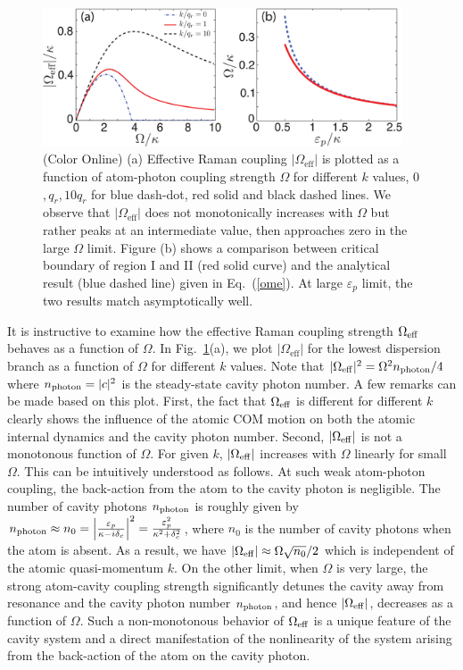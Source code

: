 \documentclass[atoms,article,submit,moreauthors,pdftex,12pt,a4paper]{mdpi}
\begin{document}
\begin{figure}[htp]
\includegraphics[width=0.95\textwidth]{fig2}\caption{(Color Online) (a) Effective Raman coupling $|\Omega_\text{eff}|$ is plotted as a function of atom-photon coupling strength $\Omega$ for different $k$ values, $0$,\,$q_r$,\,$10q_r$ for blue dash-dot, red solid and black dashed  lines. We observe that $|\Omega_\text{eff}|$ does not monotonically  increases with $\Omega$ but rather peaks at an intermediate value, then approaches zero in the large $\Omega$ limit. Figure (b) shows a comparison between critical boundary of region I and II (red solid curve) and the analytical result (blue dashed line) given in Eq.~(\ref{ome}). At large $\varepsilon_p$ limit, the two results match asymptotically well.  }\label{fig2}
\end{figure}

It is instructive to examine how the effective Raman coupling strength $\Omega_{\rm eff}$ behaves as a function of $\Omega$. In Fig.~\ref{fig2}(a), we plot $|\Omega_\text{eff}|$ for the lowest dispersion branch as a function of $\Omega$ for different $k$ values. Note that $|\Omega_{\rm eff}|^2 = \Omega^2 n_{\rm photon}/4$ where $n_{\rm photon}=|c|^2$ is the steady-state cavity photon number. A few remarks can be made based on this plot. First, the fact that $\Omega_{\rm eff}$ is different for different $k$ clearly shows the influence of the atomic COM motion on both the atomic internal dynamics and the cavity photon number. Second, $|\Omega_{\rm eff}|$ is not a monotonous function of $\Omega$. For given $k$, $|\Omega_{\rm eff}|$ increases with $\Omega$ linearly for small $\Omega$. This can be intuitively understood as follows. At such weak atom-photon coupling, the back-action from the atom to the cavity photon is negligible. The number of cavity photons $n_{\rm photon}$ is roughly given by $n_{\rm photon} \approx n_0=\left|\frac{\varepsilon_{p}}{\kappa-i\delta_{c}}\right|^2= \frac{\varepsilon_p^2}{\kappa^2+ \delta_c^2}$, where $n_0$ is the number of cavity photons when the atom is absent. As a result, we have $|\Omega_{\rm eff}| \approx \Omega \sqrt{n_0}/2$ which is independent of the atomic quasi-momentum $k$. On the other limit, when $\Omega$ is very large, the strong atom-cavity coupling strength significantly detunes the cavity away from resonance and the cavity photon number $n_{\rm photon}$, and hence $|\Omega_{\rm eff}|$, decreases as a function of $\Omega$. Such a non-monotonous behavior of $\Omega_{\rm eff}$ is a unique feature of the cavity system and a direct manifestation of the nonlinearity of the system arising from the back-action of the atom on the cavity photon.  
\end{document}
